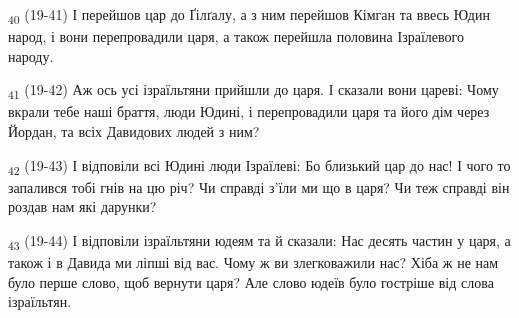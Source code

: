 \begin{tcolorbox}
\textsubscript{40} (19-41) І перейшов цар до Ґілґалу, а з ним перейшов Кімган та ввесь Юдин народ, і вони перепровадили царя, а також перейшла половина Ізраїлевого народу.
\end{tcolorbox}
\begin{tcolorbox}
\textsubscript{41} (19-42) Аж ось усі ізраїльтяни прийшли до царя. І сказали вони цареві: Чому вкрали тебе наші браття, люди Юдині, і перепровадили царя та його дім через Йордан, та всіх Давидових людей з ним?
\end{tcolorbox}
\begin{tcolorbox}
\textsubscript{42} (19-43) І відповіли всі Юдині люди Ізраїлеві: Бо близький цар до нас! І чого то запалився тобі гнів на цю річ? Чи справді з'їли ми що в царя? Чи теж справді він роздав нам які дарунки?
\end{tcolorbox}
\begin{tcolorbox}
\textsubscript{43} (19-44) І відповіли ізраїльтяни юдеям та й сказали: Нас десять частин у царя, а також і в Давида ми ліпші від вас. Чому ж ви злегковажили нас? Хіба ж не нам було перше слово, щоб вернути царя? Але слово юдеїв було гостріше від слова ізраїльтян.
\end{tcolorbox}
